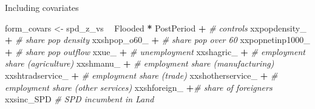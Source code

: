 \documentclass[ignorenonframetext,]{beamer}
\newenvironment{Shaded}{\begin{snugshade}}{\end{snugshade}}
\newcommand{\StringTok}[1]{\textcolor[rgb]{0.31,0.60,0.02}{#1}}
\newcommand{\CommentTok}[1]{\textcolor[rgb]{0.56,0.35,0.01}{\textit{#1}}}
\newcommand{\OperatorTok}[1]{\textcolor[rgb]{0.81,0.36,0.00}{\textbf{#1}}}
\newcommand{\NormalTok}[1]{#1}
\begin{document}
\begin{frame}[fragile]{Including covariates}

\small

\begin{Shaded}
\begin{Highlighting}[]
\NormalTok{form_covars <-}\StringTok{ }\NormalTok{spd_z_vs }\OperatorTok{~}\StringTok{ }\NormalTok{Flooded }\OperatorTok{*}\StringTok{ }\NormalTok{PostPeriod }\OperatorTok{+}
\StringTok{                  }\CommentTok{# controls}
\StringTok{                  }\NormalTok{xxpopdensity_ }\OperatorTok{+}\StringTok{ }\CommentTok{# share pop density}
\StringTok{                  }\NormalTok{xxshpop_o60_ }\OperatorTok{+}\StringTok{ }\CommentTok{# share pop over 60}
\StringTok{                  }\NormalTok{xxpopnetinp1000_ }\OperatorTok{+}\StringTok{ }\CommentTok{# share pop outflow}
\StringTok{                  }\NormalTok{xxue_ }\OperatorTok{+}\StringTok{ }\CommentTok{# unemployment}
\StringTok{                  }\NormalTok{xxshagric_ }\OperatorTok{+}\StringTok{ }\CommentTok{# employment share (agriculture) }
\StringTok{                  }\NormalTok{xxshmanu_ }\OperatorTok{+}\StringTok{ }\CommentTok{# employment share (manufacturing)        }
\StringTok{                  }\NormalTok{xxshtradservice_ }\OperatorTok{+}\StringTok{ }\CommentTok{# employment share (trade) }
\StringTok{                  }\NormalTok{xxshotherservice_ }\OperatorTok{+}\StringTok{ }\CommentTok{# employment share (other services)}
\StringTok{                  }\NormalTok{xxshforeign_ }\OperatorTok{+}\CommentTok{# share of foreigners}
\StringTok{                  }\NormalTok{xxsinc_SPD }\CommentTok{# SPD incumbent in Land}
\end{Highlighting}
\end{Shaded}

\normalsize

\end{frame}
\end{document}
